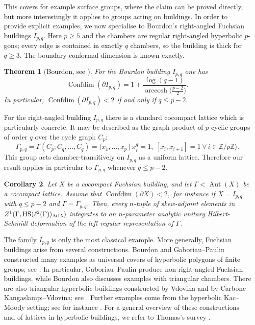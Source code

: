 \documentclass[12pt]{amsproc}
\theoremstyle{plain}
\newtheorem{theorem}{Theorem}[section]
\newtheorem{corollary}[theorem]{Corollary}
\theoremstyle{definition}
\numberwithin{equation}{section}
\newcommand{\HS}{{\rm HS}}
\DeclareMathOperator{\Ad}{Ad}
\DeclareMathOperator{\Aut}{Aut}
\DeclareMathOperator{\Confdim}{Confdim}
\DeclareMathOperator{\arccosh}{arccosh}
\begin{document}
This covers for example surface groups, where the claim can be proved directly, but more interestingly it applies to groups acting on buildings.
In order to provide explicit examples, we now specialise to Bourdon's right-angled Fuchsian buildings $I_{p,q}$. Here $p\ge 5$ and the chambers are regular right-angled
hyperbolic $p$-gons; every edge is contained in exactly $q$ chambers, so
the building is thick for $q\ge 3$.
The boundary conformal dimension is known exactly.

\begin{theorem}[Bourdon, see \cite{Bou97}]\label{thm:bourdon-confdim}
For the Bourdon building $I_{p,q}$ one has
\[
\Confdim(\partial I_{p,q})
=
1+\frac{\log(q-1)}{\arccosh\bigl(\frac{p-2}{2}\bigr)}.
\]
In particular, $\Confdim(\partial I_{p,q})<2$ if and only if
$q\le p-2.$
\end{theorem}

For the right-angled building $I_{p,q}$ there is a standard cocompact
lattice which is particularly concrete. It may be described as the graph
product of $p$ cyclic groups of order $q$ over the cycle graph $C_p$:
\[
\Gamma_{p,q}
=
\Gamma(C_p;C_q,\dots,C_q)
=
\bigl\langle
x_1,\dots,x_p
\ \big|\
x_i^q=1,\ [x_i,x_{i+1}]=1\ \forall\, i\in \mathbb Z/p\mathbb Z
\bigr\rangle.
\]
This group acts chamber-transitively on $I_{p,q}$ as a uniform lattice.
Therefore our result applies in
particular to $\Gamma_{p,q}$ whenever $q\le p-2$.

\begin{corollary} 
\label{cor:main}
Let $X$ be a cocompact Fuchsian building, and let
$\Gamma<\Aut(X)$ be a cocompact lattice. Assume that
$
\Confdim(\partial X)<2,$ for instance if $X=I_{p,q}$ with $q\le p-2$ and $\Gamma=\Gamma_{p,q}$. Then, every $n$-tuple of skew-adjoint elements in
$
Z^1(\Gamma,\HS(\ell^2(\Gamma))_{\Ad\lambda})
$
integrates to an $n$-parameter analytic unitary Hilbert-Schmidt
deformation of the left regular representation of $\Gamma$.
\end{corollary}

The family $I_{p,q}$ is only the most classical example. More generally,
Fuchsian buildings arise from several constructions.
Bourdon and Gaboriau--Paulin constructed many examples as universal covers
of hyperbolic polygons of finite groups; see \cite{Bou00,GP01}. In particular, Gaboriau--Paulin
produce non-right-angled Fuchsian buildings, while Bourdon also discusses
examples with triangular chambers. There are also triangular hyperbolic
buildings constructed by Vdovina and by Carbone--Kangaslampi--Vdovina; see
\cite{Vd02,CKV11}. Further examples come from the hyperbolic Kac--Moody setting; see for instance \cite{Thomas12}. For a
general overview of these constructions and of lattices in hyperbolic
buildings, we refer to Thomas's survey \cite{Thomas12}. 
\end{document}
